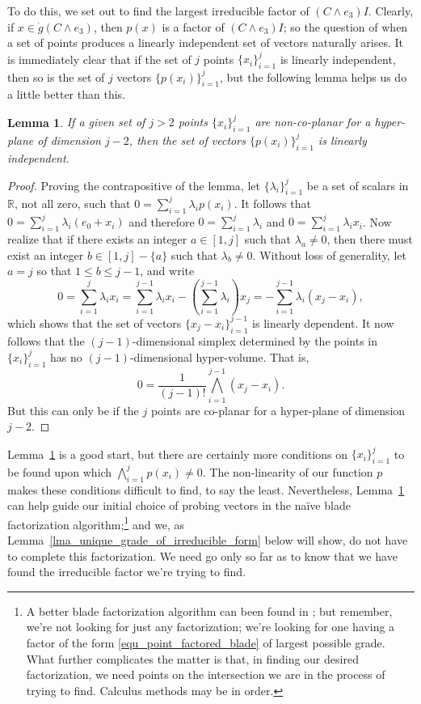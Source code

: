 \documentclass{birkjour}
\newtheorem{lem}[thm]{Lemma}
\theoremstyle{definition}
\theoremstyle{remark}
\numberwithin{equation}{section}
\newcommand{\R}{\mathbb{R}}
\newcommand{\gd}{\dot{g}}
\begin{document}
To do this, we set out to find the largest irreducible factor of $(C\wedge e_3)I$.
Clearly, if $x\in\gd(C\wedge e_3)$, then $p(x)$ is a factor of $(C\wedge e_3)I$; so
the question of when a set of points produces a linearly independent set of
vectors naturally arises.  It is immediately clear that if the set of $j$ points $\{x_i\}_{i=1}^j$
is linearly independent, then so is the set of $j$ vectors $\{p(x_i)\}_{i=1}^j$, but the following
lemma helps us do a little better than this.
\begin{lem}\label{lma_non_co_planar}
If a given set of $j>2$ points $\{x_i\}_{i=1}^j$ are non-co-planar for a hyper-plane of
dimension $j-2$, then the set of vectors $\{p(x_i)\}_{i=1}^j$ is linearly independent.
\end{lem}
\begin{proof}
Proving the contrapositive of the lemma, let $\{\lambda_i\}_{i=1}^j$ be
a set of scalars in $\R$, not all zero, such that $0=\sum_{i=1}^j\lambda_i p(x_i)$.
It follows that $0=\sum_{i=1}^j\lambda_i(e_0+x_i)$ and therefore
$0=\sum_{i=1}^j\lambda_i$ and $0=\sum_{i=1}^j\lambda_i x_i$.
Now realize that if there exists an integer $a\in[1,j]$ such that $\lambda_a\neq 0$,
then there must exist an integer $b\in[1,j]-\{a\}$ such that $\lambda_b\neq 0$.
Without loss of generality, let $a=j$ so that $1\leq b\leq j-1$, and write
\begin{equation*}
0 = \sum_{i=1}^j\lambda_ix_i = \sum_{i=1}^{j-1}\lambda_ix_i - \left(\sum_{i=1}^{j-1}\lambda_i\right)x_j = -\sum_{i=1}^{j-1}\lambda_i(x_j-x_i),
\end{equation*}
which shows that the set of vectors $\{x_j-x_i\}_{i=1}^{j-1}$ is linearly dependent.
It now follows that the $(j-1)$-dimensional simplex determined by the points in $\{x_i\}_{i=1}^j$
has no $(j-1)$-dimensional hyper-volume.  That is,
\begin{equation*}
0 = \frac{1}{(j-1)!}\bigwedge_{i=1}^{j-1}(x_j-x_i).
\end{equation*}
But this can only be if the $j$ points are co-planar for a hyper-plane of dimension $j-2$.
\end{proof}
Lemma~\ref{lma_non_co_planar} is a good start, but there are certainly more conditions on $\{x_i\}_{i=1}^j$ to be found upon which
$\bigwedge_{i=1}^j p(x_i)\neq 0$.  The non-linearity of our function $p$ makes these conditions difficult to find, to say the least.
Nevertheless, Lemma~\ref{lma_non_co_planar} can help guide our initial choice of probing vectors in the na\"{i}ve blade factorization
algorithm;\footnote{A better blade factorization algorithm can been found in \cite{Dorst10}; but remember, we're not looking
for just any factorization; we're looking for one having a factor of the form \eqref{equ_point_factored_blade} of largest possible grade.
What further complicates the matter is that, in finding
our desired factorization, we need points on
the intersection we are in the process of trying to find.  Calculus methods may be in order.} and we, as
Lemma~\ref{lma_unique_grade_of_irreducible_form} below will show,
do not have to complete this factorization.  We need go only so far as to know
that we have found the irreducible factor we're trying to find.
\end{document}
